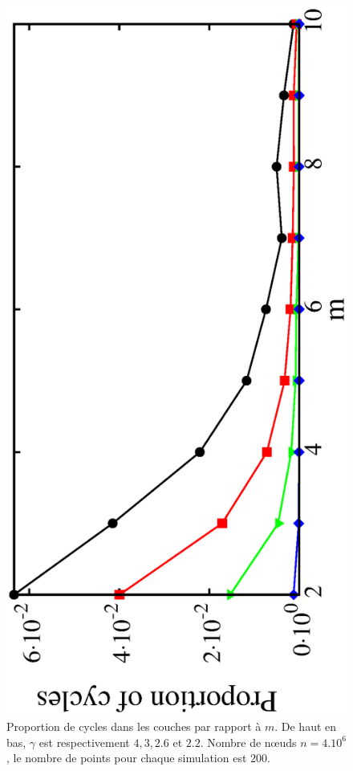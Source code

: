 \begin{figure}[h]
	\begin{center}
		\includegraphics[angle=-90,scale=0.45]{./figures/fig3-3}
	\end{center}
	\caption{Proportion de cycles dans les couches par rapport à $ m $. De haut en bas, $ \gamma $ est respectivement $ 4, 3, 2.6 $ et $ 2.2 $. Nombre de nœuds $ n = 4.10^6 $, le nombre de points pour chaque simulation est $200 $.}
	\label{fig3-3}
 \end{figure}
